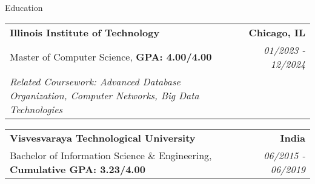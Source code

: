 \documentclass{resume} %
\begin{document}
\vspace{-12pt} %
\begin{rSection}{Education}
   \begin{tabularx}{\textwidth}{@{}X r}
   \textbf{Illinois Institute of Technology} & \textbf{Chicago, IL} \\
   \small Master of Computer Science, \textbf{GPA: 4.00/4.00} & \small \textit{01/2023 - 12/2024} \\
   \small \textit{Related Coursework: Advanced Database Organization, Computer Networks, Big Data Technologies}
   \end{tabularx}
   
   \vspace{-6pt}

   \begin{tabularx}{\textwidth}{@{}X r}
   \textbf{Visvesvaraya Technological University} & \textbf{India} \\
   \small Bachelor of Information Science \& Engineering, \textbf{Cumulative GPA: 3.23/4.00} & \small \textit{06/2015 - 06/2019} \\
   \end{tabularx}
\end{rSection}
\end{document}
